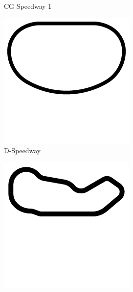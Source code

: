 \begin{figure}
\begin{subfigure}[b]{0.15\textwidth}
       \caption{CG Speedway 1}
   \end{subfigure}
\begin{subfigure}[b]{0.15\textwidth}
       \includegraphics[width=\textwidth]{img/tracks/D-Speedway}
       \caption{D-Speedway}
   \end{subfigure}
\begin{subfigure}[b]{0.15\textwidth}
       \includegraphics[width=\textwidth]{img/tracks/Dirt1}

\end{subfigure}
\end{figure}
